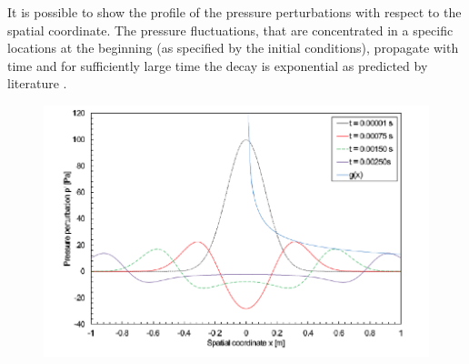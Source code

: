 It is possible to show the profile of the pressure perturbations with respect to
the spatial coordinate. The pressure fluctuations, that are concentrated  in a
specific locations at the beginning (as specified by the initial conditions),
propagate with time and for sufficiently large time the decay is exponential as
predicted by literature \cite{DoFf83}.

\begin{figure}
	\centering
	\includegraphics[width=0.7\linewidth]{Figures/prog_4.png}
	\caption{}
\end{figure}

